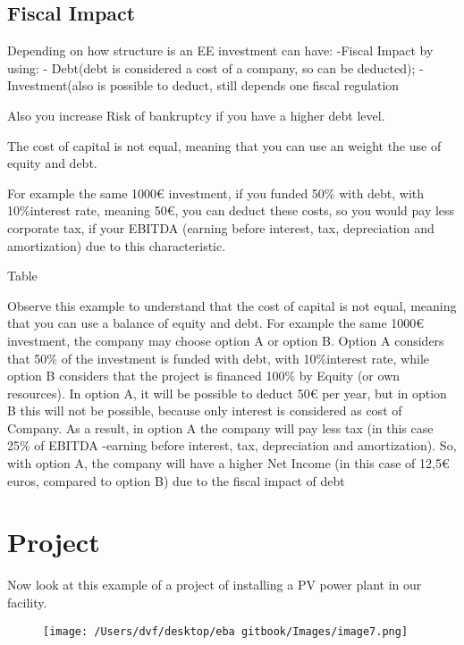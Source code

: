 \documentclass[]{book}
\newcommand{\euro}{€}
\theoremstyle{definition}
\theoremstyle{definition}
\theoremstyle{definition}
\theoremstyle{remark}
\begin{document}
\subsection{Fiscal Impact}\label{fiscal-impact}

Depending on how structure is an EE investment can have: -Fiscal Impact
by using: - Debt(debt is considered a cost of a company, so can be
deducted); - Investment(also is possible to deduct, still depends one
fiscal regulation

Also you increase Risk of bankruptcy if you have a higher debt level.

The cost of capital is not equal, meaning that you can use an weight the
use of equity and debt.

For example the same 1000\euro{} investment, if you funded 50\% with
debt, with 10\%interest rate, meaning 50\euro{}, you can deduct these
costs, so you would pay less corporate tax, if your EBITDA (earning
before interest, tax, depreciation and amortization) due to this
characteristic.

Table

Observe this example to understand that the cost of capital is not
equal, meaning that you can use a balance of equity and debt. For
example the same 1000\euro{} investment, the company may choose option A
or option B. Option A considers that 50\% of the investment is funded
with debt, with 10\%interest rate, while option B considers that the
project is financed 100\% by Equity (or own resources). In option A, it
will be possible to deduct 50\euro{} per year, but in option B this will
not be possible, because only interest is considered as cost of Company.
As a result, in option A the company will pay less tax (in this case
25\% of EBITDA -earning before interest, tax, depreciation and
amortization). So, with option A, the company will have a higher Net
Income (in this case of 12,5\euro{} euros, compared to option B) due to
the fiscal impact of debt

\section{Project}\label{project}

Now look at this example of a project of installing a PV power plant in
our facility.

\begin{figure}[htbp]
\centering
\texttt{[image: /Users/dvf/desktop/eba gitbook/Images/image7.png]}
\caption{}
\end{figure}
\end{document}
